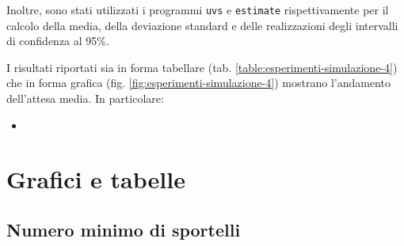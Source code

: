 Inoltre, sono stati utilizzati i programmi \texttt{uvs} e \texttt{estimate} rispettivamente per il calcolo della media, della deviazione standard e delle realizzazioni degli intervalli di confidenza al 95\%.

I risultati riportati sia in forma tabellare (tab. \ref{table:esperimenti-simulazione-4}) che in forma grafica (fig. \ref{fig:esperimenti-simulazione-4}) mostrano l'andamento dell'attesa media. In particolare:
\begin{itemize}
\item 
\end{itemize}

\section{Grafici e tabelle}
\subsection*{Numero minimo di sportelli}
\captionsetup[table]{justification=centering}
